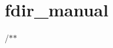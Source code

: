 \chapter{fdir\+\_\+manual }
\hypertarget{md_doc_2fdir__manual}{}\label{md_doc_2fdir__manual}
/\+\texorpdfstring{$\ast$}{*}\texorpdfstring{$\ast$}{*} 